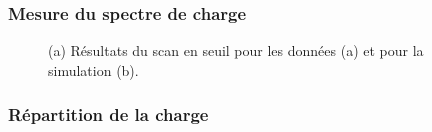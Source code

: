 \subsubsection{Mesure du spectre de charge}

\begin{figure}[!ht]
  \caption{(a) Résultats du scan en seuil pour les données (a) et pour la simulation (b). \label{fig.thrScan}}
\end{figure}


\subsubsection{Répartition de la charge}

